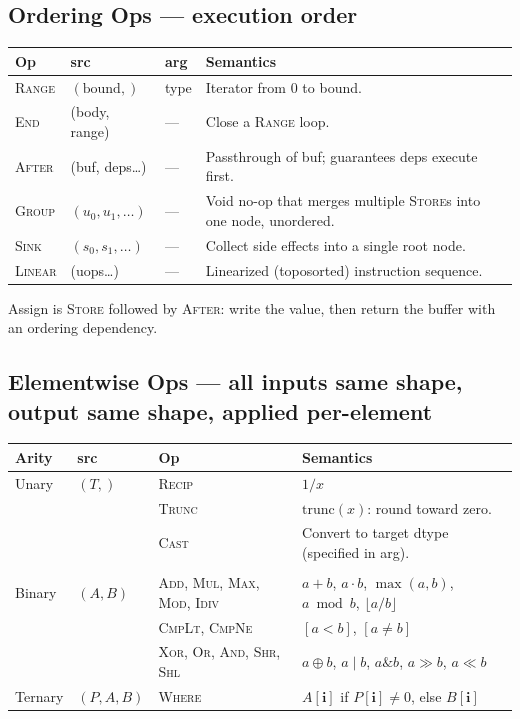 \documentclass[10pt,letterpaper]{article}
\newcommand{\op}[1]{\textsc{#1}}
\begin{document}
\subsection*{{\color{assignbrown}Ordering Ops} \normalfont\small--- execution order}

\begin{tabular}{@{}l l l p{6.0cm}@{}}
\toprule
\textbf{Op} & \textbf{src} & \textbf{arg} & \textbf{Semantics} \\
\midrule
\op{Range} & $(\text{bound},)$ & type & Iterator from $0$ to bound. \\
\op{End} & (body, range) & --- & Close a \op{Range} loop. \\
\op{After} & (buf, deps\ldots) & --- & Passthrough of buf; guarantees deps execute first. \\
\op{Group} & $(u_0, u_1, \ldots)$ & --- & Void no-op that merges multiple \op{Store}s into one node, unordered. \\
\op{Sink} & $(s_0, s_1, \ldots)$ & --- & Collect side effects into a single root node. \\
\op{Linear} & (uops\ldots) & --- & Linearized (toposorted) instruction sequence. \\
\bottomrule
\end{tabular}

\smallskip
Assign is \op{Store} followed by \op{After}: write the value, then return the buffer with an ordering dependency.

\subsection*{{\color{elwyellow}Elementwise Ops} \normalfont\small--- all inputs same shape, output same shape, applied per-element}

\begin{tabular}{@{}l l l l@{}}
\toprule
\textbf{Arity} & \textbf{src} & \textbf{Op} & \textbf{Semantics} \\
\midrule
Unary & $(T,)$
  & \op{Recip}
  & $1/x$ \\
& & \op{Trunc}
  & $\mathrm{trunc}(x)$: round toward zero. \\
& & \op{Cast}
  & Convert to target dtype (specified in arg). \\
  \\[4pt]
Binary & $(A, B)$
  & \op{Add}, \op{Mul}, \op{Max}, \op{Mod}, \op{Idiv}
  & $a+b$, $a \cdot b$, $\max(a,b)$, $a \bmod b$, $\lfloor a/b \rfloor$ \\
& & \op{CmpLt}, \op{CmpNe}
  & $[a < b]$, $[a \ne b]$ \\
& & \op{Xor}, \op{Or}, \op{And}, \op{Shr}, \op{Shl}
  & $a \oplus b$, $a \mid b$, $a \mathbin{\&} b$, $a \gg b$, $a \ll b$ \\[4pt]
Ternary & $(P, A, B)$
  & \op{Where}
  & $A[\mathbf{i}]$ if $P[\mathbf{i}] \ne 0$, else $B[\mathbf{i}]$ \\

\bottomrule
\end{tabular}
\end{document}
